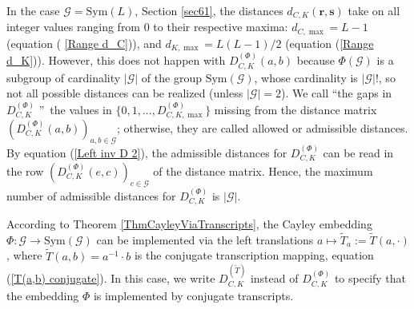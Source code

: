 \documentclass[%
 aip,
 amsmath,amssymb,
 reprint,%
]{revtex4-1}
\newtheorem{remark}[theorem]{Remark}
\begin{document}
In the case $\mathcal{G}=\mathrm{Sym}(L)$, Section \ref{sec61}, the
distances $d_{C,K}(\mathbf{r},\mathbf{s})$ take on all integer values
ranging from $0$ to their respective maxima: $d_{C,\max }=L-1$ (equation (%
\ref{Range d_C})), and $d_{K,\max }=L(L-1)/2$ (equation (\ref{Range d_K})).
However, this does not happen with $D_{C,K}^{(\Phi )}(a,b)$ because $\Phi (%
\mathcal{G})$ is a subgroup of cardinality $\left\vert \mathcal{G}%
\right\vert $ of the group $\mathrm{Sym}(\mathcal{G})$, whose cardinality is 
$\left\vert \mathcal{G}\right\vert !$, so not all possible distances can be
realized (unless $\left\vert \mathcal{G}\right\vert =2$). We call
\textquotedblleft the gaps in $D_{C,K}^{(\Phi )}$%
\textquotedblright\ the values in $\{0,1,...,D_{C,K,\max }^{(\Phi )}\}$ missing
from the distance matrix $(D_{C,K}^{(\Phi )}(a,b))_{a,b\in 
\mathcal{G}}$; otherwise, they are called allowed or admissible distances.
By equation (\ref{Left inv D 2}), the admissible distances for $%
D_{C,K}^{(\Phi )}$ can be read in the row $(D_{C,K}^{(\Phi )}(e,c))_{c\in 
\mathcal{G}}$ of the distance matrix. Hence, the maximum number of
admissible distances for $D_{C,K}^{(\Phi )}$ is $\left\vert \mathcal{G}%
\right\vert $.

According to Theorem \ref{ThmCayleyViaTranscripts}, the Cayley embedding $%
\Phi :\mathcal{G}\rightarrow \mathrm{Sym}(\mathcal{G})$ can be implemented
via the left translations $a\mapsto \tilde{T}_{a}:=\tilde{T}(a,\cdot )$,
where $\tilde{T}(a,b)=a^{-1}\cdot b$ is the conjugate transcription mapping, equation (\ref{T(a,b) conjugate}). In this case, we write $%
D_{C,K}^{(\tilde{T})}$ instead of $D_{C,K}^{(\Phi )}$ to specify that the
embedding $\Phi $ is implemented by conjugate transcripts.
\end{document}
